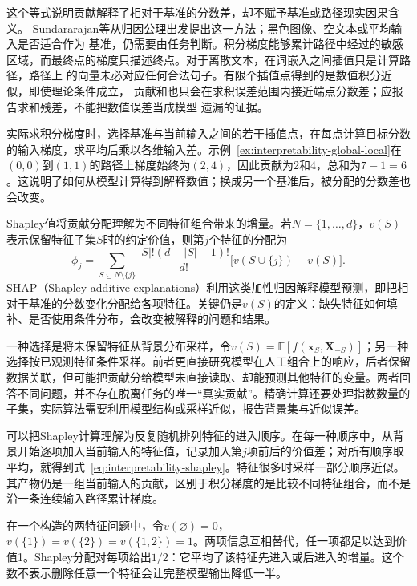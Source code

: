 这个等式说明贡献解释了相对于基准的分数差，却不赋予基准或路径现实因果含义。
Sundararajan等从归因公理出发提出这一方法；黑色图像、空文本或平均输入是否适合作为
基准，仍需要由任务判断。积分梯度能够累计路径中经过的敏感
区域，而最终点的梯度只描述终点。对于离散文本，在词嵌入之间插值只是计算路径，路径上
的向量未必对应任何合法句子。有限个插值点得到的是数值积分近似，即使理论条件成立，
贡献和也只会在求积误差范围内接近端点分数差；应报告求和残差，不能把数值误差当成模型
遗漏的证据。

实际求积分梯度时，选择基准与当前输入之间的若干插值点，在每点计算目标分数的输入梯度，求平均后乘以各维输入差。示例~\ref{ex:interpretability-global-local}在$(0,0)$到$(1,1)$的路径上梯度始终为$(2,4)$，因此贡献为2和4，总和为$7-1=6$。这说明了如何从模型计算得到解释数值；换成另一个基准后，被分配的分数差也会改变。

Shapley值将贡献分配理解为不同特征组合带来的增量。若$N=\{1,\ldots,d\}$，$v(S)$表示保留特征子集$S$时的约定价值，则第$j$个特征的分配为
\begin{equation}
 \phi_j=\sum_{S\subseteq N\setminus\{j\}}
 \frac{|S|!(d-|S|-1)!}{d!}
 \bigl[v(S\cup\{j\})-v(S)\bigr].
 \label{eq:interpretability-shapley}
\end{equation}
SHAP（Shapley additive explanations）利用这类加性归因解释模型预测，即把相对于基准的分数变化分配给各项特征。关键仍是$v(S)$的定义：缺失特征如何填补、是否使用条件分布，会改变被解释的问题和结果。

一种选择是将未保留特征从背景分布采样，令$v(S)=\mathbb E[f(\bm{x}_S,\bm{X}_{-S})]$；另一种选择按已观测特征条件采样。前者更直接研究模型在人工组合上的响应，后者保留数据关联，但可能把贡献分给模型未直接读取、却能预测其他特征的变量。两者回答不同问题，并不存在脱离任务的唯一“真实贡献”。精确计算还要处理指数数量的子集，实际算法需要利用模型结构或采样近似，报告背景集与近似误差。

可以把Shapley计算理解为反复随机排列特征的进入顺序。在每一种顺序中，从背景开始逐项加入当前输入的特征值，记录加入第$j$项前后的价值差；对所有顺序取平均，就得到式~\eqref{eq:interpretability-shapley}。特征很多时采样一部分顺序近似。其产物仍是一组当前输入的贡献，区别于积分梯度的是比较不同特征组合，而不是沿一条连续输入路径累计梯度。

\begin{example}[共同信息的贡献分配]
\label{ex:interpretability-redundancy}
在一个构造的两特征问题中，令$v(\varnothing)=0$，$v(\{1\})=v(\{2\})=v(\{1,2\})=1$。两项信息互相替代，任一项都足以达到价值1。Shapley分配对每项给出$1/2$：它平均了该特征先进入或后进入的增量。这个数不表示删除任意一个特征会让完整模型输出降低一半。
\end{example}

